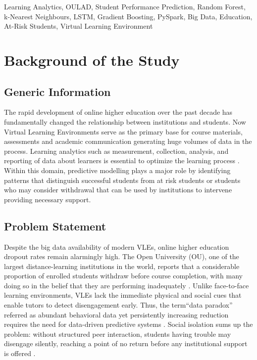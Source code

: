 \documentclass[conference]{IEEEtran}
\begin{document}
\begin{IEEEkeywords}
Learning Analytics, OULAD, Student Performance Prediction, Random Forest, k-Nearest Neighbours, LSTM, Gradient Boosting, PySpark, Big Data, Education, At-Risk Students, Virtual Learning Environment
\end{IEEEkeywords}

\section{Background of the Study}

\subsection{Generic Information}
The rapid development of online higher education over the past decade has fundamentally changed the relationship between institutions and students. Now Virtual Learning Environments serve as the primary base for course materials, assessments and academic communication generating huge volumes of data in the process. Learning analytics such as measurement, collection, analysis, and reporting of data about learners is essential to optimize the learning process \cite{12}. Within this domain, predictive modelling plays a major role by identifying patterns that distinguish successful students from at risk students or students who may consider withdrawal that can be used by institutions to intervene providing necessary support.

\subsection{Problem Statement}
Despite the big data availability of modern VLEs, online higher education dropout rates remain alarmingly high. The Open University (OU), one of the largest distance-learning institutions in the world, reports that a considerable proportion of enrolled students withdraw before course completion, with many doing so in the belief that they are performing inadequately \cite{10}. Unlike face-to-face learning environments, VLEs lack the immediate physical and social cues that enable tutors to detect disengagement early. Thus, the term``data paradox'' referred as abundant behavioral data yet persistently increasing reduction requires the need for data-driven predictive systems \cite{5}. Social isolation sums up the problem: without structured peer interaction, students having trouble may disengage silently, reaching a point of no return before any institutional support is offered \cite{7, 11}.
\end{document}
